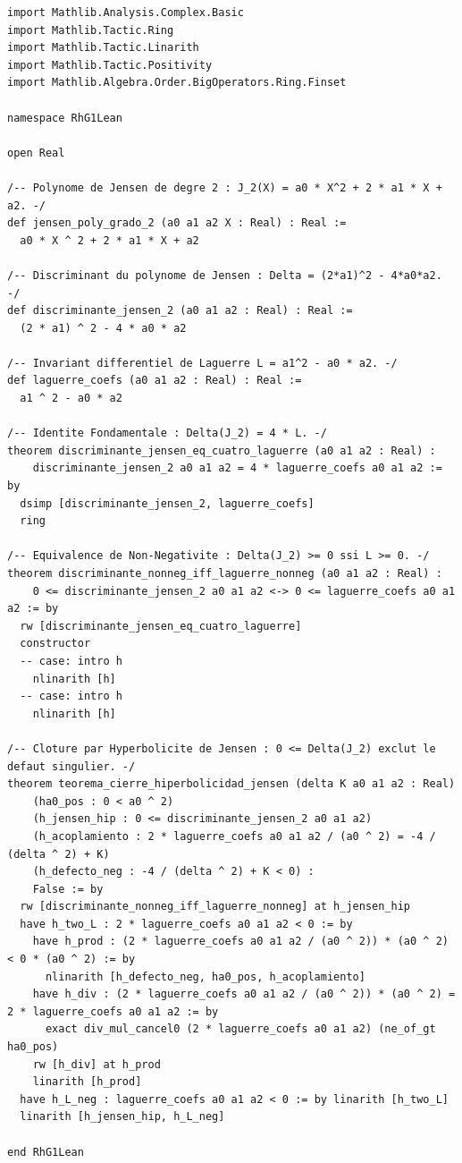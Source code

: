 \documentclass[11pt,a4paper]{article}
\theoremstyle{definition}
\theoremstyle{remark}
\begin{document}
\begin{lstlisting}[language=Lean4]
import Mathlib.Analysis.Complex.Basic
import Mathlib.Tactic.Ring
import Mathlib.Tactic.Linarith
import Mathlib.Tactic.Positivity
import Mathlib.Algebra.Order.BigOperators.Ring.Finset

namespace RhG1Lean

open Real

/-- Polynome de Jensen de degre 2 : J_2(X) = a0 * X^2 + 2 * a1 * X + a2. -/
def jensen_poly_grado_2 (a0 a1 a2 X : Real) : Real :=
  a0 * X ^ 2 + 2 * a1 * X + a2

/-- Discriminant du polynome de Jensen : Delta = (2*a1)^2 - 4*a0*a2. -/
def discriminante_jensen_2 (a0 a1 a2 : Real) : Real :=
  (2 * a1) ^ 2 - 4 * a0 * a2

/-- Invariant differentiel de Laguerre L = a1^2 - a0 * a2. -/
def laguerre_coefs (a0 a1 a2 : Real) : Real :=
  a1 ^ 2 - a0 * a2

/-- Identite Fondamentale : Delta(J_2) = 4 * L. -/
theorem discriminante_jensen_eq_cuatro_laguerre (a0 a1 a2 : Real) :
    discriminante_jensen_2 a0 a1 a2 = 4 * laguerre_coefs a0 a1 a2 := by
  dsimp [discriminante_jensen_2, laguerre_coefs]
  ring

/-- Equivalence de Non-Negativite : Delta(J_2) >= 0 ssi L >= 0. -/
theorem discriminante_nonneg_iff_laguerre_nonneg (a0 a1 a2 : Real) :
    0 <= discriminante_jensen_2 a0 a1 a2 <-> 0 <= laguerre_coefs a0 a1 a2 := by
  rw [discriminante_jensen_eq_cuatro_laguerre]
  constructor
  -- case: intro h
    nlinarith [h]
  -- case: intro h
    nlinarith [h]

/-- Cloture par Hyperbolicite de Jensen : 0 <= Delta(J_2) exclut le defaut singulier. -/
theorem teorema_cierre_hiperbolicidad_jensen (delta K a0 a1 a2 : Real)
    (ha0_pos : 0 < a0 ^ 2)
    (h_jensen_hip : 0 <= discriminante_jensen_2 a0 a1 a2)
    (h_acoplamiento : 2 * laguerre_coefs a0 a1 a2 / (a0 ^ 2) = -4 / (delta ^ 2) + K)
    (h_defecto_neg : -4 / (delta ^ 2) + K < 0) :
    False := by
  rw [discriminante_nonneg_iff_laguerre_nonneg] at h_jensen_hip
  have h_two_L : 2 * laguerre_coefs a0 a1 a2 < 0 := by
    have h_prod : (2 * laguerre_coefs a0 a1 a2 / (a0 ^ 2)) * (a0 ^ 2) < 0 * (a0 ^ 2) := by
      nlinarith [h_defecto_neg, ha0_pos, h_acoplamiento]
    have h_div : (2 * laguerre_coefs a0 a1 a2 / (a0 ^ 2)) * (a0 ^ 2) = 2 * laguerre_coefs a0 a1 a2 := by
      exact div_mul_cancel0 (2 * laguerre_coefs a0 a1 a2) (ne_of_gt ha0_pos)
    rw [h_div] at h_prod
    linarith [h_prod]
  have h_L_neg : laguerre_coefs a0 a1 a2 < 0 := by linarith [h_two_L]
  linarith [h_jensen_hip, h_L_neg]

end RhG1Lean
\end{lstlisting}
\end{document}
